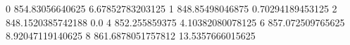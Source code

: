 0 854.83056640625 6.67852783203125
1 848.85498046875 0.70294189453125
2 848.1520385742188 0.0
4 852.255859375 4.10382080078125
6 857.072509765625 8.92047119140625
8 861.6878051757812 13.5357666015625
